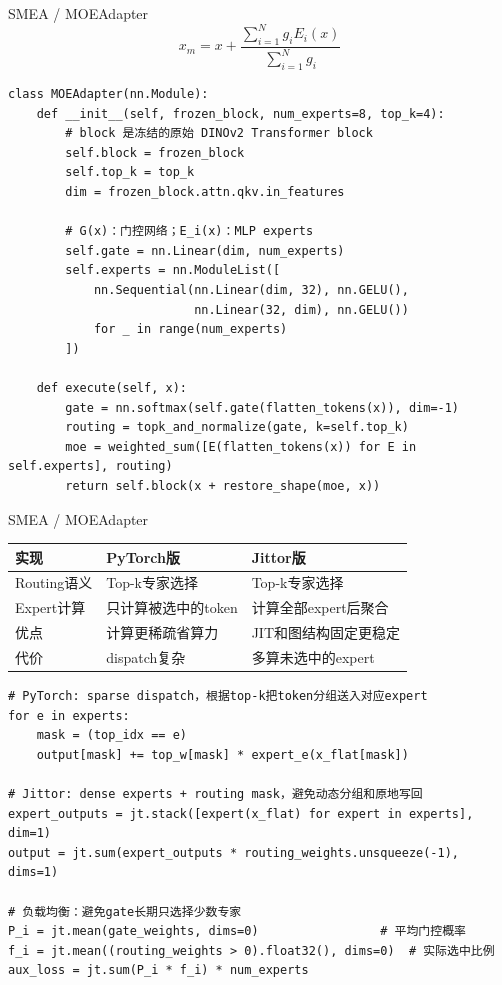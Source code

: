 \begin{frame}[fragile]{SMEA / MOEAdapter}
\[
  x_m = x + \frac{\sum_{i=1}^{N} g_i E_i(x)}{\sum_{i=1}^{N} g_i}
\]
\begin{lstlisting}[style=pythoncode,basicstyle=\ttfamily\tiny]
class MOEAdapter(nn.Module):
    def __init__(self, frozen_block, num_experts=8, top_k=4):
        # block 是冻结的原始 DINOv2 Transformer block
        self.block = frozen_block
        self.top_k = top_k
        dim = frozen_block.attn.qkv.in_features

        # G(x)：门控网络；E_i(x)：MLP experts
        self.gate = nn.Linear(dim, num_experts)
        self.experts = nn.ModuleList([
            nn.Sequential(nn.Linear(dim, 32), nn.GELU(),
                          nn.Linear(32, dim), nn.GELU())
            for _ in range(num_experts)
        ])

    def execute(self, x):
        gate = nn.softmax(self.gate(flatten_tokens(x)), dim=-1)
        routing = topk_and_normalize(gate, k=self.top_k)
        moe = weighted_sum([E(flatten_tokens(x)) for E in self.experts], routing)
        return self.block(x + restore_shape(moe, x))
\end{lstlisting}
\end{frame}

\begin{frame}[fragile]{SMEA / MOEAdapter}
  \footnotesize
  \renewcommand{\arraystretch}{1.18}
  \begin{tabular}{p{} p{} p{}}
    \toprule
    实现 & PyTorch版 & Jittor版 \\
    \midrule
    Routing语义 & Top-k专家选择 & Top-k专家选择 \\
    Expert计算 & 只计算被选中的token & 计算全部expert后聚合 \\
    优点 & 计算更稀疏省算力 & JIT和图结构固定更稳定 \\
    代价 & dispatch复杂 & 多算未选中的expert \\
    \bottomrule
  \end{tabular}

  \vspace{0.35em}
\begin{lstlisting}[style=pythoncode,basicstyle=\ttfamily\tiny]
# PyTorch: sparse dispatch，根据top-k把token分组送入对应expert
for e in experts:
    mask = (top_idx == e)
    output[mask] += top_w[mask] * expert_e(x_flat[mask])

# Jittor: dense experts + routing mask，避免动态分组和原地写回
expert_outputs = jt.stack([expert(x_flat) for expert in experts], dim=1)
output = jt.sum(expert_outputs * routing_weights.unsqueeze(-1), dims=1)

# 负载均衡：避免gate长期只选择少数专家
P_i = jt.mean(gate_weights, dims=0)                 # 平均门控概率
f_i = jt.mean((routing_weights > 0).float32(), dims=0)  # 实际选中比例
aux_loss = jt.sum(P_i * f_i) * num_experts
\end{lstlisting}
\end{frame}

